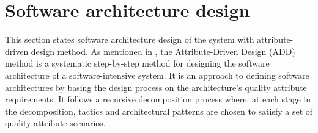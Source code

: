 \section{Software architecture design}
This section states software architecture design of the system with attribute-driven design method. As mentioned in \cite{smi-cme}, the Attribute-Driven Design (ADD) method is a systematic step-by-step method for designing the software architecture of a software-intensive system. It is an approach to defining software architectures by basing the design process on the architecture's quality attribute requirements. It follows a recursive decomposition process where, at each stage in the decomposition, tactics and architectural patterns are chosen to satisfy a set of quality attribute scenarios.